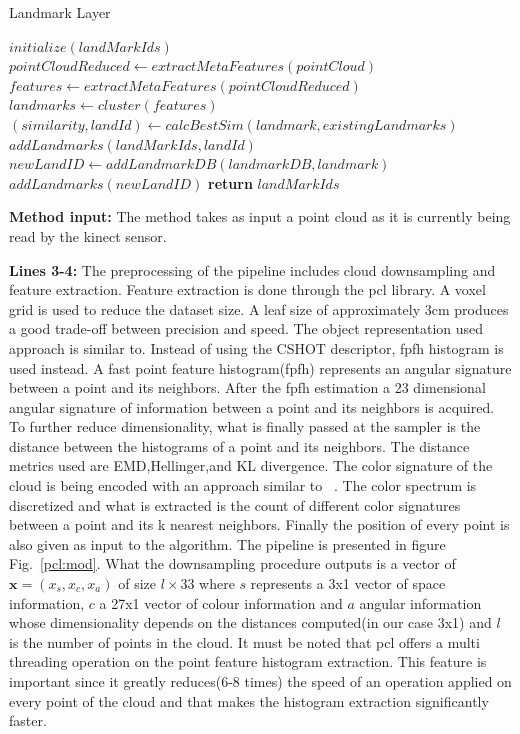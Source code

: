 \documentclass[twoside,hidelinks]{article}
\begin{document}
\begin{algorithm}
  \caption{Landmark Layer}\label{euclid}
  \begin{algorithmic}[1]
      \State $initialize(landMarkIds)$
      \State $pointCloudReduced \gets extractMetaFeatures(pointCloud)$ 
      \State $features \gets extractMetaFeatures(pointCloudReduced)$
      \State $landmarks \gets cluster(features)$  
	      \State $ (similarity, landId) \gets calcBestSim(landmark, existingLandmarks) $
			   \State $ addLandmarks(landMarkIds, landId)$
			\Else 
			   \State $ newLandID \gets addLandmarkDB(landmarkDB, landmark)$
			   \State $addLandmarks(newLandID)$
			\EndIf
      \EndFor
      \State \textbf{return} $ landMarkIds$
    \EndProcedure
  \end{algorithmic}
\end{algorithm}


\textbf{Method input:} The method takes as input a point cloud as it is currently being read by the kinect sensor.

\textbf{Lines 3-4:} The preprocessing of the pipeline includes cloud downsampling and feature extraction. Feature extraction is done through the pcl\cite{pcl} library. A voxel grid is used to reduce the dataset size. A leaf size of approximately 3cm produces a good trade-off between precision and speed. The object representation used approach is similar to\cite{objectpointslam}. Instead of using the CSHOT descriptor, fpfh\cite{fpfh} histogram is used instead. A fast point feature histogram(fpfh) represents an angular signature between a point and its neighbors. After the fpfh estimation a 23 dimensional angular signature of information between a point and its neighbors is acquired. To further reduce dimensionality, what is finally passed at the sampler is the distance between the histograms of a point and its neighbors. The distance metrics used are EMD,Hellinger,and KL divergence. The color signature of the cloud is being encoded with an approach similar to ~\cite{smcddp}. The color spectrum is discretized and what is extracted is the count of different color signatures between a point and its k nearest neighbors. Finally the position of every point is also given as input to the algorithm. The pipeline is presented in figure Fig.~\ref{pcl:mod}. What the downsampling procedure outputs is a vector of $ \textbf{x} = (x_s, x_c, x_a) $ of size $l \times 33 $ where $s$ represents a 3x1 vector of space information, $c$ a 27x1 vector of colour information and $a$ angular information whose dimensionality depends on the distances computed(in our case 3x1) and $l$ is the number of points in the cloud. It must be noted that pcl offers a multi threading operation on the point feature histogram extraction. This feature is important since it greatly reduces(6-8 times) the speed of an operation applied on every point of the cloud and that makes the histogram extraction significantly faster.
\end{document}

